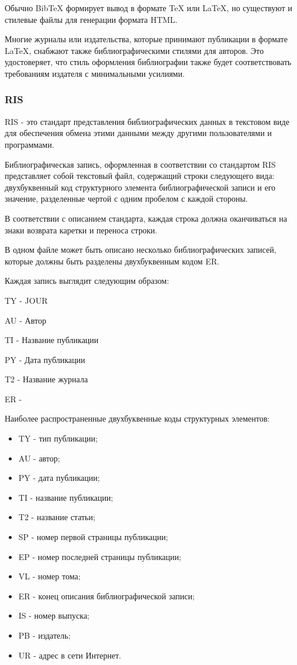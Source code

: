 Обычно BibTeX формирует вывод в формате TeX или LaTeX, но существуют и стилевые файлы для генерации формата HTML.

Многие журналы или издательства, которые принимают публикации в формате LaTeX, снабжают также библиографическими стилями для авторов. Это удостоверяет, что стиль оформления библиографии также будет соответствовать требованиям издателя с минимальными усилиями.

\subsubsection{RIS}

RIS - это стандарт представления библиографических данных в текстовом виде для обеспечения обмена этими данными между другими пользователями и программами.

Библиографическая запись, оформленная в соответствии со стандартом RIS представляет собой текстовый файл, содержащий строки следующего вида: двухбуквенный код структурного элемента библиографической записи и его значение, разделенные чертой с одним пробелом с каждой стороны.

В соответствии с описанием стандарта, каждая строка должна оканчиваться на знаки возврата каретки и переноса строки.

В одном файле может быть описано несколько библиографических записей, которые должны быть разделены двухбуквенным кодом ER.

Каждая запись выглядит следующим образом:

TY - JOUR \par
AU - Автор \par
TI - Название публикации \par
PY - Дата публикации \par
T2 - Название журнала \par
ER - 

Наиболее распространенные двухбуквенные коды структурных элементов:

\begin{itemize}
	\item TY - тип публикации;
	\item AU - автор;
	\item PY - дата публикации;
	\item TI - название публикации;
	\item T2 - название статьи;
	\item SP - номер первой страницы публикации;
	\item EP - номер последней страницы публикации;
	\item VL - номер тома;
	\item ER - конец описания библиографической записи;
	\item IS - номер выпуска;
	\item PB - издатель;
	\item UR - адрес в сети Интернет.
\end{itemize}

